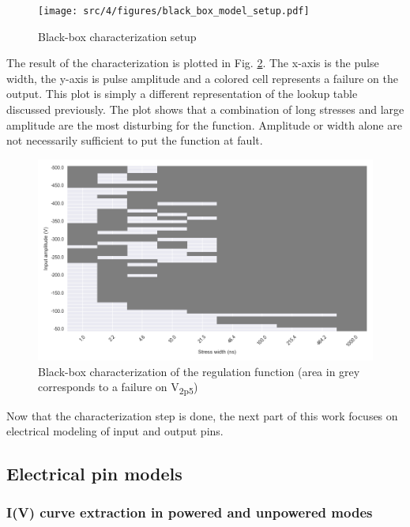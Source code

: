 \begin{figure}[!h]
  \centering
  \texttt{[image: src/4/figures/black\_box\_model\_setup.pdf]}
  \caption{Black-box characterization setup}
  \label{fig:cz-black-box-setup}
\end{figure}

The result of the characterization is plotted in Fig. \ref{fig:cz-black-box}.
The x-axis is the pulse width, the y-axis is pulse amplitude and a colored cell represents a failure on the output.
This plot is simply a different representation of the lookup table discussed previously.
The plot shows that a combination of long stresses and large amplitude are the most disturbing for the function.
Amplitude or width alone are not necessarily sufficient to put the function at fault.

\begin{figure}[!h]
  \centering
  \includegraphics[width=\textwidth]{src/4/figures/black_box_regulator.png}
  \caption{Black-box characterization of the regulation function (area in grey corresponds to a failure on V\textsubscript{2p5})}
  \label{fig:cz-black-box}
\end{figure}

Now that the characterization step is done, the next part of this work focuses on electrical modeling of input and output pins.

\subsection{Electrical pin models}
\subsubsection{I(V) curve extraction in powered and unpowered modes}

